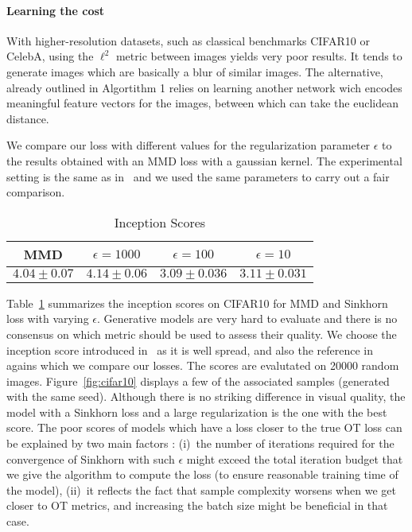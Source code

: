\paragraph{Learning the cost} With higher-resolution datasets, such as classical benchmarks CIFAR10 or CelebA, using the $\ell^2$ metric between images yields very poor results. It tends to generate images which are basically a blur of similar images. The alternative, already outlined in Algortithm 1 relies on learning another network wich encodes meaningful feature vectors for the images, between which can take the euclidean distance.

We compare our loss with different values for the regularization parameter $\epsilon$ to the results obtained with an MMD loss with a gaussian kernel. The experimental setting is the same as in~\cite{MMDGAN} and we used the same parameters to carry out a fair comparison. 


\begin{table}
\centering
 \begin{tabular}{c c c c  }
        MMD  & $\epsilon = 1000$ & $\epsilon = 100$ & $\epsilon = 10$   \\  \hline 
     $4.04 \pm 0.07$ & $4.14 \pm 0.06$  &  $3.09 \pm 0.036$    &  $3.11 \pm 0.031$     
    \end{tabular}
\caption{Inception Scores} \label{tab:inception}
  \end{table}


Table~\ref{tab:inception} summarizes the inception scores on CIFAR10 for MMD and Sinkhorn loss with varying $\epsilon$. Generative models are very hard to evaluate and there is no consensus on which metric should be used to assess their quality. We choose the inception score introduced in~\cite{inception} as it is well spread, and also the reference in~\cite{MMD-GAN} agains which we compare our losses. The scores are evalutated on 20000 random images.  Figure~\ref{fig:cifar10} displays a few of the associated samples (generated with the same seed). Although there is no striking difference in visual quality, the model with a Sinkhorn loss and a large regularization is the one with the best score. The poor scores of models which have a loss closer to the true OT loss can be explained by two main factors : (i)~the number of iterations required for the convergence of Sinkhorn with such $\epsilon$ might exceed the total iteration budget that we give the algorithm to compute the loss (to ensure reasonable training time of the model), (ii)~it reflects the fact that sample complexity worsens when we get closer to OT metrics, and increasing the batch size might be beneficial in that case.

  
